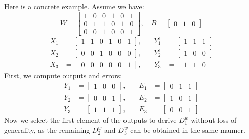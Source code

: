 \documentclass{article}
\theoremstyle{definition}
\theoremstyle{remark}
\begin{document}
Here is a concrete example. Assume we have:
\[
    W = \begin{bmatrix}
        1 & 0 & 0 & 1 & 0 & 1 \\
        0 & 1 & 1 & 0 & 1 & 0 \\
        0 & 0 & 1 & 0 & 0 & 1
    \end{bmatrix}, \quad
    B = \begin{bmatrix} 0 & 1 & 0 \end{bmatrix}
\]
\[
    \begin{aligned}
        X_1 & = \begin{bmatrix} 1 & 1 & 0 & 1 & 0 & 1 \end{bmatrix}, \\
        X_2 & = \begin{bmatrix} 0 & 0 & 1 & 0 & 0 & 0 \end{bmatrix}, \\
        X_3 & = \begin{bmatrix} 0 & 0 & 0 & 0 & 0 & 1 \end{bmatrix},
    \end{aligned} \quad
    \begin{aligned}
        Y^e_1 & = \begin{bmatrix} 1 & 1 & 1 \end{bmatrix} \\
        Y^e_2 & = \begin{bmatrix} 1 & 0 & 0 \end{bmatrix} \\
        Y^e_3 & = \begin{bmatrix} 1 & 1 & 0 \end{bmatrix}
    \end{aligned}
\]
First, we compute outputs and errors:
\[
    \begin{aligned}
        Y_1 & = \begin{bmatrix} 1 & 0 & 0 \end{bmatrix}, \\
        Y_2 & = \begin{bmatrix} 0 & 0 & 1 \end{bmatrix}, \\
        Y_3 & = \begin{bmatrix} 1 & 1 & 1 \end{bmatrix},
    \end{aligned} \quad
    \begin{aligned}
        E_1 & = \begin{bmatrix} 0 & 1 & 1 \end{bmatrix} \\
        E_2 & = \begin{bmatrix} 1 & 0 & 1 \end{bmatrix} \\
        E_3 & = \begin{bmatrix} 0 & 0 & 1 \end{bmatrix}
    \end{aligned}
\]
Now we select the first element of the outputs to derive \( D^w_1 \) without loss of generality, as the remaining \( D^w_2 \) and \( D^w_3 \) can be obtained in the same manner.
\end{document}
